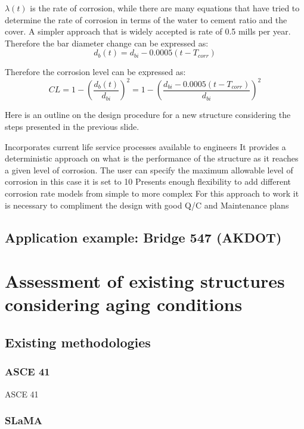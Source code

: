 $\lambda(t)$ is the rate of corrosion, while there are many equations that have tried to determine the rate of corrosion in terms of the water to cement ratio and the cover. A simpler approach that is widely accepted is rate of 0.5 mills per year. Therefore the bar diameter change can be expressed as:
\begin{equation}
    d_{b}(t)=d_{bi}-0.0005(t-T_{corr})
\end{equation}

Therefore the corrosion level can be expressed as:
\begin{equation}
    CL=1-\left(\frac{d_{b}(t)}{d_{bi}}\right)^2=1-\left(\frac{d_{bi}-0.0005(t-T_{corr})}{d_{bi}}\right)^2
\end{equation}

Here is an outline on the design procedure for a new structure considering the steps presented in the previous slide.

Incorporates current life service processes available to engineers
It provides a deterministic approach on what is the performance of the structure as it reaches a given level of corrosion.
The user can specify the maximum allowable level of corrosion in this case it is set to 10%
Presents enough flexibility to add different corrosion rate models from simple to more complex
For this approach to work it is necessary to compliment the design with  good Q/C and Maintenance plans



\subsection{Application example: Bridge 547 (AKDOT)}

\section{Assessment of existing structures considering aging conditions}

\subsection{Existing methodologies}

\subsubsection{ASCE 41}

ASCE 41 

\subsubsection{SLaMA}

